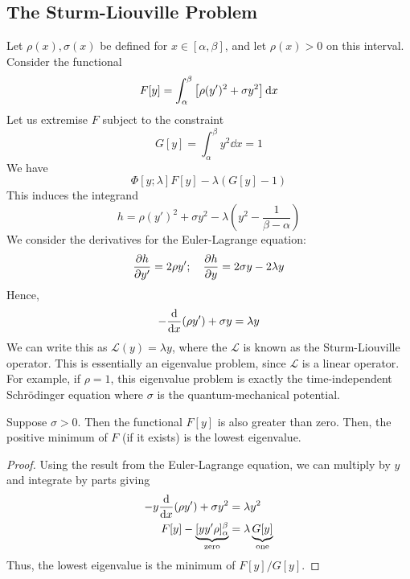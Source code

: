 \subsection{The Sturm-Liouville Problem}
Let \( \rho(x), \sigma(x) \) be defined for \( x \in [\alpha, \beta] \), and let \( \rho(x) > 0 \) on this interval.
Consider the functional
\[ F[y] = \int_\alpha^\beta \qty[ \rho (y')^2 + \sigma y^2 ]\dd{x} \]
Let us extremise \( F \) subject to the constraint
\[ G[y] = \int_\alpha^\beta y^2 \dd{x} = 1 \]
We have
\[ \Phi[y;\lambda]  F[y] - \lambda (G[y] - 1) \]
This induces the integrand
\[ h = \rho (y')^2 + \sigma y^2 - \lambda (y^2 - \frac{1}{\beta - \alpha}) \]
We consider the derivatives for the Euler-Lagrange equation:
\[ \pdv{h}{y'} = 2 \rho y';\quad \pdv{h}{y} = 2 \sigma y - 2 \lambda y \]
Hence,
\[ -\dv{x}\qty(\rho y') + \sigma y = \lambda y \]
We can write this as \( \mathcal L(y) = \lambda y \), where the \( \mathcal L \) is known as the Sturm-Liouville operator.
This is essentially an eigenvalue problem, since \( \mathcal L \) is a linear operator.
For example, if \( \rho = 1 \), this eigenvalue problem is exactly the time-independent Schr\"odinger equation where \( \sigma \) is the quantum-mechanical potential.

Suppose \( \sigma > 0 \). Then the functional \( F[y] \) is also greater than zero. Then, the positive minimum of \( F \) (if it exists) is the lowest eigenvalue.
\begin{proof}
    Using the result from the Euler-Lagrange equation, we can multiply by \( y \) and integrate by parts giving
    \begin{align*}
        -y\dv{x}\qty(\rho y') + \sigma y^2 &= \lambda y^2 \\
        F[y] - \underbrace{[y y' \rho]_\alpha^\beta}_{\text{zero}} &= \lambda \underbrace{G[y]}_{\text{one}}
    \end{align*}
    Thus, the lowest eigenvalue is the minimum of \( F[y] / G[y] \).
\end{proof}

